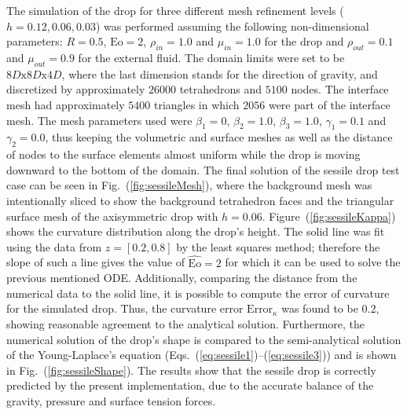 \documentclass{wccm2014}
\newcommand{\Eo}{\mathrm{Eo}}
\begin{document}
The simulation of the drop for three different mesh refinement levels
($h={0.12,0.06,0.03}$) was performed assuming the following
non-dimensional parameters: $R=0.5$, $\Eo=2$, $\rho_{in}=1.0$ and
$\mu_{in}=1.0$ for the drop and $\rho_{out}=0.1$ and $\mu_{out}=0.9$ for
the external fluid. The domain limits were set to be
$8D\text{x}8D\text{x}4D$, where the last dimension stands for the
direction of gravity, and discretized by approximately $26000$
tetrahedrons and $5100$ nodes. The interface mesh had approximately
$5400$ triangles in which $2056$ were part of the interface mesh. The
mesh parameters used were $\beta_1=0$, $\beta_2=1.0$, $\beta_3=1.0$,
$\gamma_1=0.1$ and $\gamma_2=0.0$, thus keeping the volumetric and
surface meshes as well as the distance of nodes to the surface elements
almost uniform while the drop is moving downward to the bottom of the
domain. The final solution of the sessile drop test case
can be seen in Fig.~(\ref{fig:sessileMesh}), where the background mesh
was intentionally sliced to show the background tetrahedron faces and
the triangular surface mesh of the axisymmetric drop with $h=0.06$.
Figure~(\ref{fig:sessileKappa}) shows the curvature distribution along
the drop's height. The solid line was fit using the data from
$z=[0.2,0.8]$ by the least squares method; therefore the slope of such a
line gives the value of $\hat{\Eo}=2$ for which it can be used to solve
the previous mentioned ODE. Additionally, comparing the distance from
the numerical data to the solid line, it is possible to compute the
error of curvature for the simulated drop. Thus, the curvature error
$\text{Error}_{\kappa}$ was found to be $0.2$, showing reasonable
agreement to the analytical solution. Furthermore, the numerical
solution of the drop's shape is compared to the semi-analytical solution
of the Young-Laplace's equation
(Eqs.~(\ref{eq:sessile1})--(\ref{eq:sessile3}))
and is shown in Fig.~(\ref{fig:sessileShape}). The results show that the
sessile drop is correctly predicted by the present implementation, due
to the accurate balance of the gravity, pressure and surface tension
forces.
\end{document}
